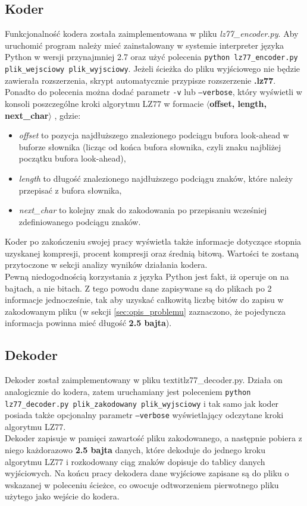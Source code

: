 \documentclass{article}
\def\code#1{\texttt{#1}}
\begin{document}
\subsection{Koder}
Funkcjonalność kodera została zaimplementowana w pliku \textit{lz77\_encoder.py}. Aby uruchomić program należy mieć zainstalowany w systemie interpreter języka Python w wersji przynajmniej 2.7 oraz użyć polecenia \code{python lz77\_encoder.py plik\_wejsciowy plik\_wyjsciowy}. Jeżeli ścieżka do pliku wyjściowego nie będzie zawierała rozszerzenia, skrypt automatycznie przypisze rozszerzenie \textbf{.lz77}. Ponadto do polecenia można dodać parametr \code{-v} lub \code{--verbose}, który wyświetli w konsoli poszczególne kroki algorytmu LZ77 w formacie \textbf{$\langle$offset, length, next\_char$\rangle$} , gdzie:
\begin{itemize}
    \item \textit{offset} to pozycja najdłuższego znalezionego podciągu bufora look-ahead w buforze słownika (licząc od końca bufora słownika, czyli znaku najbliżej początku bufora look-ahead),
    \item \textit{length} to długość znalezionego najdłuższego podciągu znaków, które należy przepisać z bufora słownika,
    \item \textit{next\_char} to kolejny znak do zakodowania po przepisaniu wcześniej zdefiniowanego podciągu znaków.
\end{itemize}
Koder po zakończeniu swojej pracy wyświetla także informacje dotyczące stopnia uzyskanej kompresji, procent kompresji oraz średnią bitową. Wartości te zostaną przytoczone w sekcji analizy wyników działania kodera.
\\ Pewną niedogodnością korzystania z języka Python jest fakt, iż operuje on na bajtach, a nie bitach. Z tego powodu dane zapisywane są do plikach po 2 informacje jednocześnie, tak aby uzyskać całkowitą liczbę bitów do zapisu w zakodowanym pliku (w sekcji \ref{sec:opis_problemu} zaznaczono, że pojedyncza informacja powinna mieć długość \textbf{2.5 bajta}). 

\subsection{Dekoder}
Dekoder został zaimplementowany w pliku textit{lz77\_decoder.py}. Działa on analogicznie do kodera, zatem uruchamiany jest poleceniem \code{python lz77\_decoder.py plik\_zakodowany plik\_wyjsciowy} i tak samo jak koder posiada także opcjonalny parametr \code{--verbose} wyświetlający odczytane kroki algorytmu LZ77.
\\Dekoder zapisuje w pamięci zawartość pliku zakodowanego, a następnie pobiera z niego każdorazowo \textbf{2.5 bajta} danych, które dekoduje do jednego kroku algorytmu LZ77 i rozkodowany ciąg znaków dopisuje do tablicy danych wyjściowych. Na końcu pracy dekodera dane wyjściowe zapisane są do pliku o wskazanej w poleceniu ścieżce, co owocuje odtworzeniem pierwotnego pliku użytego jako wejście do kodera.
\end{document}
